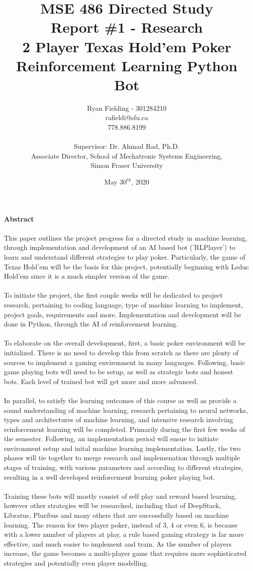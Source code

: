 \documentclass[12pt]{article}
\title{MSE 486 Directed Study\\Report \#1 - Research\\ \bigskip \textbf{2 Player Texas Hold'em Poker\\Reinforcement Learning Python Bot}}
\author{Ryan Fielding - 301284210\\rafieldi@sfu.ca\\778.886.8199\\\\Supervisor: Dr. Ahmad Rad, Ph.D.\\Associate Director, School of Mechatronic Systems Engineering,\\Simon Fraser University}
\date{May $30^{th}$, 2020}
\begin{document}
\maketitle
\newpage

{\Large \textbf{Abstract\\\\}}
This paper outlines the project progress for a directed study in machine learning, through implementation and development of an AI based bot ('RLPlayer') to learn and understand different strategies to play poker. Particularly, the game of Texas Hold'em will be the basis for this project, potentially beginning with Leduc Hold'em since it is a much simpler version of the game.\\\\
To initiate the project, the first couple weeks will be dedicated to project research, pertaining to coding language, type of machine learning to implement, project goals, requirements and more. Implementation and development will be done in Python, through the AI of reinforcement learning.\\\\
To elaborate on the overall development, first, a basic poker environment will be initialized. There is no need to develop this from scratch as there are plenty of sources to implement a gaming environment in many languages. Following, basic game playing bots will need to be setup, as well as strategic bots and honest bots. Each level of trained bot will get more and more advanced.\\\\
In parallel, to satisfy the learning outcomes of this course as well as provide a sound understanding of machine learning, research pertaining to neural networks, types and architectures of machine learning, and intensive research involving reinforcement learning will be completed. Primarily during the first few weeks of the semester. Following, an implementation period will ensue to initiate environment setup and inital machine learning implementation. Lastly, the two phases will tie together to merge research and implemenation through multiple stages of training, with various parameters and according to different strategies, resulting in a well developed reinforcement learning poker playing bot.\\\\
Training these bots will mostly consist of self play and reward based learning, however other strategies will be researched, including that of DeepStack, Libratus, Pluribus and many others that are successfully based on machine learning. The reason for two player poker, instead of 3, 4 or even 6, is because with a lower number of players at play, a rule based gaming strategy is far more effective, and much easier to implement and train. As the number of players increase, the game becomes a multi-player game that requires more sophisticated strategies and potentially even player modelling.\\\\
\end{document}
